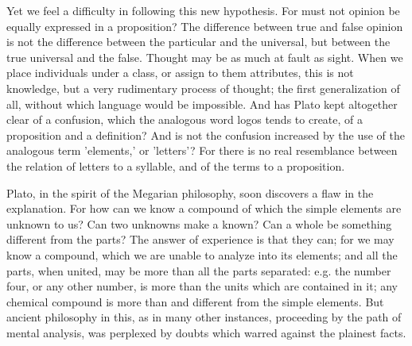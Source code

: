 Yet we feel a difficulty in following this new hypothesis. For must not
opinion be equally expressed in a proposition? The difference between
true and false opinion is not the difference between the particular and
the universal, but between the true universal and the false. Thought may
be as much at fault as sight. When we place individuals under a
class, or assign to them attributes, this is not knowledge, but a very
rudimentary process of thought; the first generalization of all, without
which language would be impossible. And has Plato kept altogether clear
of a confusion, which the analogous word logos tends to create, of a
proposition and a definition? And is not the confusion increased by the
use of the analogous term 'elements,' or 'letters'? For there is no real
resemblance between the relation of letters to a syllable, and of the
terms to a proposition.

Plato, in the spirit of the Megarian philosophy, soon discovers a flaw
in the explanation. For how can we know a compound of which the simple
elements are unknown to us? Can two unknowns make a known? Can a whole
be something different from the parts? The answer of experience is that
they can; for we may know a compound, which we are unable to analyze
into its elements; and all the parts, when united, may be more than all
the parts separated: e.g. the number four, or any other number, is more
than the units which are contained in it; any chemical compound is more
than and different from the simple elements. But ancient philosophy
in this, as in many other instances, proceeding by the path of mental
analysis, was perplexed by doubts which warred against the plainest
facts.

